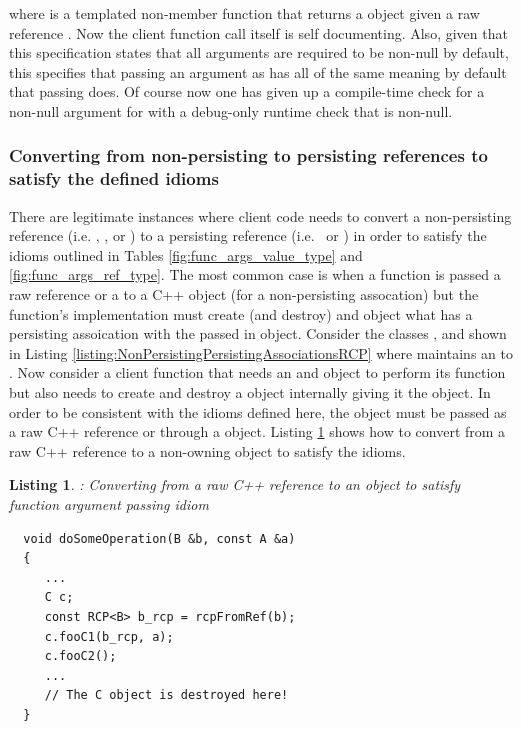 \documentclass[pdf,ps2pdf,11pt]{SANDreport}
\newtheorem{listing}{Listing}
\begin{document}
where {} is a templated non-member function that
returns a {} object given a raw reference {}.
Now the client function call itself is self documenting.  Also, given
that this specification states that all {} arguments are
required to be non-null by default, this specifies that passing an
argument as {} has all of the same meaning by
default that passing {} does.  Of course now one has given up
a compile-time check for a non-null argument for {} with a
debug-only runtime check that {} is non-null.


%
{}\subsubsection*{Converting from non-persisting to persisting
references to satisfy the defined idioms}
%

There are legitimate instances where client code needs to convert a
non-persisting reference (i.e. {}, {}, or
{}) to a persisting reference (i.e.\ {} or
{}) in order to satisfy the idioms outlined in Tables
{}\ref{fig:func_args_value_type} and {}\ref{fig:func_args_ref_type}.
The most common case is when a function is passed a raw reference or a
{} to a C++ object (for a non-persisting assocation) but the
function's implementation must create (and destroy) and object what
has a persisting assoication with the passed in object.  Consider the
classes {}, {} and {} shown in Listing
{}\ref{listing:NonPersistingPersistingAssociationsRCP} where {}
maintains an {} to {}.  Now consider a client function
that needs an {} and {} object to perform its function
but also needs to create and destroy a {} object internally
giving it the {} object.  In order to be consistent with the
idioms defined here, the {} object must be passed as a raw C++
reference or through a {} object.  Listing
{}\ref{listing:convert-from-raw-ref-to-RCP} shows how to convert from
a raw C++ reference to a non-owning {} object to satisfy the
idioms.


{}\begin{listing}: Converting from a raw C++ reference to an
{} object to satisfy function argument passing idiom
\label{listing:convert-from-raw-ref-to-RCP}
{\small\begin{verbatim}
  void doSomeOperation(B &b, const A &a)
  {
     ...
     C c;
     const RCP<B> b_rcp = rcpFromRef(b);
     c.fooC1(b_rcp, a);
     c.fooC2();
     ...
     // The C object is destroyed here!
  }
\end{verbatim}}
\end{listing}
\end{document}
